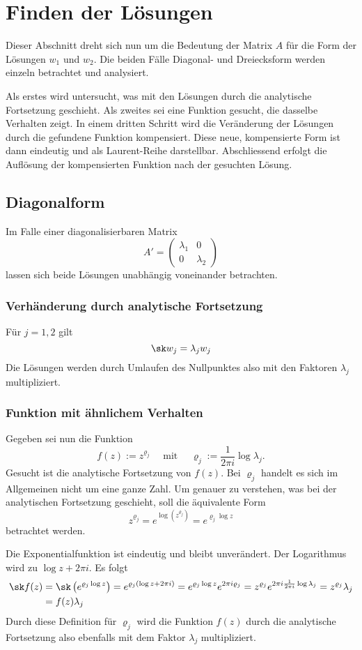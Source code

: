 \section{Finden der Lösungen}
Dieser Abschnitt dreht sich nun um die Bedeutung der Matrix $A$ für die Form der Lösungen $w_1$ und $w_2$. 
Die beiden Fälle Diagonal- und Dreiecksform werden einzeln betrachtet und analysiert.

Als erstes wird untersucht, was mit den Lösungen durch die analytische Fortsetzung geschieht.
Als zweites sei eine Funktion gesucht, die dasselbe Verhalten zeigt.
In einem dritten Schritt wird die Veränderung der Lösungen durch die gefundene Funktion kompensiert. Diese neue, kompensierte Form ist dann eindeutig und als Laurent-Reihe darstellbar.
Abschliessend erfolgt die Auflösung der kompensierten Funktion nach der gesuchten Lösung.

\subsection{Diagonalform}
Im Falle einer diagonalisierbaren Matrix 
\[A'=\begin{pmatrix}\lambda_1 & 0 \\ 0 & \lambda_2 \end{pmatrix}\]
lassen sich beide Lösungen unabhängig voneinander betrachten. 
\subsubsection{Verhänderung durch analytische Fortsetzung}
Für $j=1,2$ gilt
\[\sk w_j = \lambda_j w_j\]
Die Lösungen werden durch Umlaufen des Nullpunktes also mit den Faktoren $\lambda_j$ multipliziert.

\subsubsection{Funktion mit ähnlichem Verhalten}
Gegeben sei nun die Funktion
\[f(z):=z^{\varrho_j} \quad\text{ mit }\quad \varrho_j := \frac{1}{2\pi i}\log \lambda_j.\]
Gesucht ist die analytische Fortsetzung von $f(z)$.
Bei $\varrho_j$ handelt es sich im Allgemeinen nicht um eine ganze Zahl.
Um genauer zu verstehen, was bei der analytischen Fortsetzung geschieht, soll die äquivalente Form
\[z^{\varrho_j} = e^{\log(z^{\varrho_j})} = e^{\varrho_j \log z}\]
betrachtet werden.

Die Exponentialfunktion ist eindeutig und bleibt unverändert.
Der Logarithmus wird zu $\log z + 2\pi i$.
Es folgt
\begin{align*}
\sk f(z)
&= \sk \left(e^{\varrho_j \log z} \right) 
= e^{\varrho_j \left(\log z + 2\pi i\right)} 
= e^{\varrho_j \log z}  e^{2\pi i\varrho_j}
= z^{\varrho_j} e^{2\pi i\frac{1}{2\pi i}\log \lambda_j} 
= z^{\varrho_j} \lambda_j\\
&= f(z) \lambda_j
\end{align*}
Durch diese Definition für $\varrho_j$ wird die Funktion $f(z)$ durch die analytische Fortsetzung also ebenfalls mit dem Faktor $\lambda_j$ multipliziert. 

